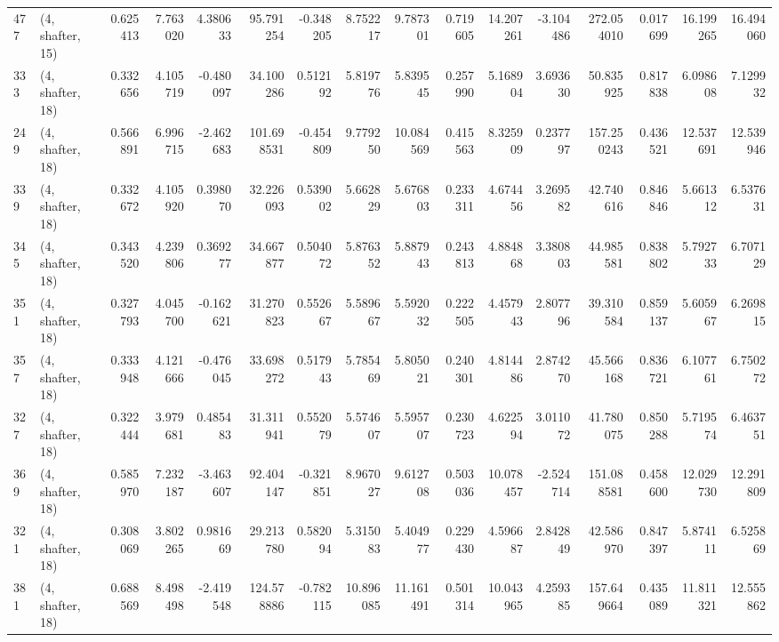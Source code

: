 \begin{tabular}{llrrrrrrrrrrrrrr}
477 &  (4, shafter, 15) &   0.625413 &   7.763020 &   4.380633 &    95.791254 &  -0.348205 &   8.752217 &   9.787301 &  0.719605 &  14.207261 &  -3.104486 &   272.054010 &  0.017699 &  16.199265 &  16.494060 \\
333 &  (4, shafter, 18) &   0.332656 &   4.105719 &  -0.480097 &    34.100286 &   0.512192 &   5.819776 &   5.839545 &  0.257990 &   5.168904 &   3.693630 &    50.835925 &  0.817838 &   6.098608 &   7.129932 \\
249 &  (4, shafter, 18) &   0.566891 &   6.996715 &  -2.462683 &   101.698531 &  -0.454809 &   9.779250 &  10.084569 &  0.415563 &   8.325909 &   0.237797 &   157.250243 &  0.436521 &  12.537691 &  12.539946 \\
339 &  (4, shafter, 18) &   0.332672 &   4.105920 &   0.398070 &    32.226093 &   0.539002 &   5.662829 &   5.676803 &  0.233311 &   4.674456 &   3.269582 &    42.740616 &  0.846846 &   5.661312 &   6.537631 \\
345 &  (4, shafter, 18) &   0.343520 &   4.239806 &   0.369277 &    34.667877 &   0.504072 &   5.876352 &   5.887943 &  0.243813 &   4.884868 &   3.380803 &    44.985581 &  0.838802 &   5.792733 &   6.707129 \\
351 &  (4, shafter, 18) &   0.327793 &   4.045700 &  -0.162621 &    31.270823 &   0.552667 &   5.589667 &   5.592032 &  0.222505 &   4.457943 &   2.807796 &    39.310584 &  0.859137 &   5.605967 &   6.269815 \\
357 &  (4, shafter, 18) &   0.333948 &   4.121666 &  -0.476045 &    33.698272 &   0.517943 &   5.785469 &   5.805021 &  0.240301 &   4.814486 &   2.874270 &    45.566168 &  0.836721 &   6.107761 &   6.750272 \\
327 &  (4, shafter, 18) &   0.322444 &   3.979681 &   0.485483 &    31.311941 &   0.552079 &   5.574607 &   5.595707 &  0.230723 &   4.622594 &   3.011072 &    41.780075 &  0.850288 &   5.719574 &   6.463751 \\
369 &  (4, shafter, 18) &   0.585970 &   7.232187 &  -3.463607 &    92.404147 &  -0.321851 &   8.967027 &   9.612708 &  0.503036 &  10.078457 &  -2.524714 &   151.088581 &  0.458600 &  12.029730 &  12.291809 \\
321 &  (4, shafter, 18) &   0.308069 &   3.802265 &   0.981669 &    29.213780 &   0.582094 &   5.315083 &   5.404977 &  0.229430 &   4.596687 &   2.842849 &    42.586970 &  0.847397 &   5.874111 &   6.525869 \\
381 &  (4, shafter, 18) &   0.688569 &   8.498498 &  -2.419548 &   124.578886 &  -0.782115 &  10.896085 &  11.161491 &  0.501314 &  10.043965 &   4.259385 &   157.649664 &  0.435089 &  11.811321 &  12.555862 \\

\end{tabular}
